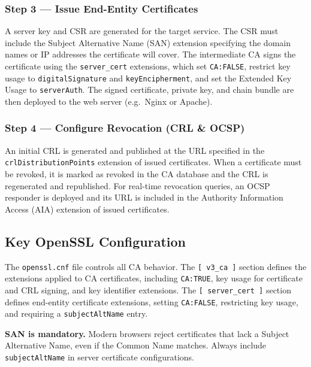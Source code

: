 \documentclass[10pt,twocolumn]{article}
\begin{document}
\subsubsection{Step 3 --- Issue End-Entity Certificates}

A server key and CSR are generated for the target service. The CSR must
include the Subject Alternative Name (SAN) extension specifying the domain
names or IP addresses the certificate will cover. The intermediate CA signs
the certificate using the \texttt{server\_cert} extensions, which set
\texttt{CA:FALSE}, restrict key usage to \texttt{digitalSignature} and
\texttt{keyEncipherment}, and set the Extended Key Usage to
\texttt{serverAuth}. The signed certificate, private key, and chain bundle
are then deployed to the web server (e.g.\ Nginx or Apache).

\subsubsection{Step 4 --- Configure Revocation (CRL \& OCSP)}

An initial CRL is generated and published at the URL specified in the
\texttt{crlDistributionPoints} extension of issued certificates. When a
certificate must be revoked, it is marked as revoked in the CA database and
the CRL is regenerated and republished. For real-time revocation queries, an
OCSP responder is deployed and its URL is included in the
Authority Information Access (AIA) extension of issued certificates.

\subsection{Key OpenSSL Configuration}

The \texttt{openssl.cnf} file controls all CA behavior. The
\texttt{[ v3\_ca ]} section defines the extensions applied to CA
certificates, including \texttt{CA:TRUE}, key usage for certificate and CRL
signing, and key identifier extensions. The \texttt{[ server\_cert ]}
section defines end-entity certificate extensions, setting \texttt{CA:FALSE},
restricting key usage, and requiring a \texttt{subjectAltName} entry.

\begin{alertbox}
\footnotesize\textbf{SAN is mandatory.} Modern browsers reject certificates
that lack a Subject Alternative Name, even if the Common Name matches.
Always include \texttt{subjectAltName} in server certificate configurations.
\end{alertbox}
\end{document}
